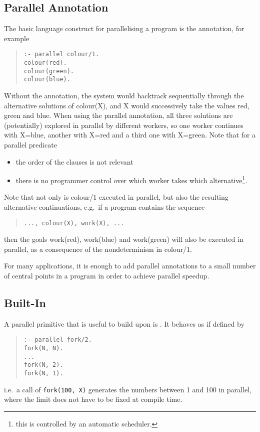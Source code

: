\subsection{Parallel Annotation}
The basic language construct for parallelising a program is
the  annotation, for example
\begin{quote}\begin{verbatim}
:- parallel colour/1.
colour(red).
colour(green).
colour(blue).
\end{verbatim}\end{quote}
Without the annotation, the system would backtrack sequentially through the
alternative solutions of colour(X), and X would successively take the values
red, green and blue.
When using the parallel annotation, all three solutions are (potentially)
explored in parallel by different workers, so one worker continues with X=blue,
another with X=red and a third one with X=green.
Note that for a parallel predicate
\begin{itemize}
\item the order of the clauses is not relevant
\item there is no programmer control over which worker takes which
alternative\footnote{this is controlled by an automatic scheduler.}.
\end{itemize}
Note that not only is colour/1 executed in parallel, but also the
resulting alternative continuations, e.g.\ if a program contains
the sequence
\begin{quote}\begin{verbatim}
..., colour(X), work(X), ...
\end{verbatim}\end{quote}
then the goals work(red), work(blue) and work(green) will also be executed
in parallel, as a consequence of the nondeterminism in colour/1.

For many applications, it is enough to add parallel annotations
to a small number
of central points in a program in order to achieve parallel speedup.

\subsection{Built-In}
A parallel primitive that is useful to build upon is .
It behaves as if defined by
\begin{quote}\begin{verbatim}
:- parallel fork/2.
fork(N, N).
...
fork(N, 2).
fork(N, 1).
\end{verbatim}\end{quote}
i.e.\ a call of {\tt fork(100, X)} generates the numbers between 1 and 100
in parallel, where the limit does not have to be fixed at compile time.

